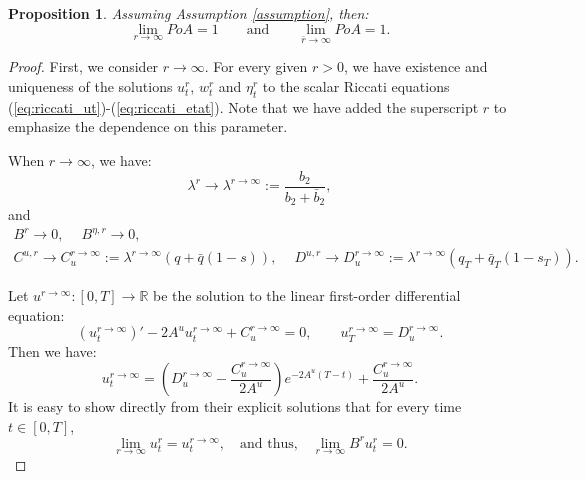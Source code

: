 \documentclass[11pt]{article}
\newtheorem{proposition}{Proposition}
\begin{document}
\begin{proposition}
	Assuming Assumption \ref{assumption}, then:
	\begin{equation*}
			\lim_{r \to \infty} PoA = 1 \qquad \text{and} \qquad
			\lim_{\bar{r} \to \infty} PoA = 1.
	\end{equation*}
	\label{prop:r_bar_r}
\end{proposition}
\begin{proof}
	First, we consider $r \to \infty$. For every given $r >0$, we have existence and uniqueness of the solutions $u^{r}_t$, $w^{r}_t$ and $\eta^{r}_t$ to the scalar Riccati equations (\ref{eq:riccati_ut})-(\ref{eq:riccati_etat}). Note that we have added the superscript $r$ to emphasize the dependence on this parameter. 
	
	When $r \to \infty$, we have:
	\begin{equation*}
		\lambda^r \longrightarrow \lambda^{r\to\infty} := \frac{b_2}{b_2 + \bar{b}_2},
	\end{equation*}
	and
	\begin{equation*}
	\begin{array}{l}
		B^r \longrightarrow 0,\quad \ B^{\eta,r} \longrightarrow 0,\\
		C^{u,r} \longrightarrow C_u^{r\to \infty} := \lambda^{r \to \infty}(q + \bar{q}(1-s)),\quad \ D^{u,r} \to D_u^{r \to \infty} := \lambda^{r \to \infty}(q_T+ \bar{q}_T(1-s_T)).
	\end{array}
	\end{equation*}

	Let $u^{r \to \infty}:[0,T] \to \mathbb{R}$ be the solution to the linear first-order differential equation:
	\begin{equation*}
		\left({u}^{r \to \infty}_t\right)' - 2A^u u_t^{r \to \infty} + C^{r \to \infty}_u = 0, \qquad u_T^{r \to \infty} = D^{r \to \infty}_u.
	\end{equation*}
	Then we have:
	\begin{equation*}
	u_t^{r \to \infty} = \left(D^{r \to \infty}_u - \frac{C^{r \to \infty}_u}{2A^u} \right) e^{-2A^u (T-t)} +  \frac{C^{r \to \infty}_u}{2A^u}.
	\end{equation*}
	It is easy to show directly from their explicit solutions that for every time $t\in [0,T]$, $$\lim_{r \to \infty}u^r_t=u^{r \to \infty}_t, \quad \text{and thus,} \quad \lim_{r \to \infty}B^ru^r_t=0.$$
	

\end{proof}
\end{document}
